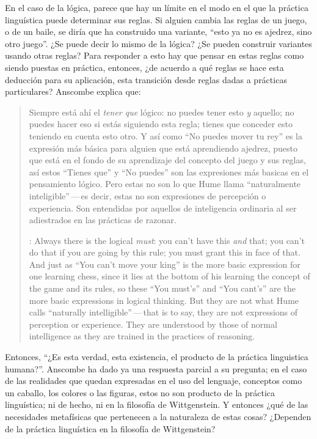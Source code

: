 En el caso de la lógica, parece que hay un límite en el modo en el que la práctica linguística puede determinar sus reglas. Si alguien cambia las reglas de un juego, o de un baile, se diría que ha construido una variante, \enquote{esto ya no es ajedrez, sino otro juego}. ¿Se puede decir lo mismo de la lógica? ¿Se pueden construir variantes usando otras reglas? Para responder a esto hay que pensar en estas reglas como siendo puestas en práctica, entonces, ¿de acuerdo a qué reglas se hace esta deducción para su aplicación, esta transición desde reglas dadas a prácticas particulares? Anscombe explica que: \blockquote[{\cite[121]{anscombe1981parmenides:qli}}: Always there is the logical \emph{must}: you can't have this \emph{and} that; you can't do that if you are going by this rule; you must grant this in face of that. And just as ``You can't move your king'' is the more basic expression for one learning chess, since it lies at the bottom of his learning the concept of the game and its rules, so these ``You must's'' and ``You cant's'' are the more basic expressions in logical thinking. But they are not what Hume calls ``naturally intelligible''\,---\,that is to say, they are not expressions of perception or experience. They are understood by those of normal intelligence as they are trained in the practices of reasoning.]{Siempre está ahí el \emph{tener que} lógico: no puedes tener esto \emph{y} aquello; no puedes hacer eso si estás siguiendo esta regla; tienes que conceder esto teniendo en cuenta esto otro. Y así como ``No puedes mover tu rey'' es la expresión más básica para alguien que está aprendiendo ajedrez, puesto que está en el fondo de su aprendizaje del concepto del juego y sus reglas, así estos ``Tienes que'' y ``No puedes'' son las expresiones más basicas en el pensamiento lógico. Pero estas no son lo que Hume llama ``naturalmente inteligible''\,---\,es decir, estas no son expresiones de percepción o experiencia. Son entendidas por aquellos de inteligencia ordinaria al ser adiestrados en las prácticas de razonar.}

Entonces, ``¿Es esta verdad, esta existencia, el producto de la práctica linguistica humana?''. Anscombe ha dado ya una respuesta parcial a su pregunta; en el caso de las realidades que quedan expresadas en el uso del lenguaje, conceptos como un caballo, los colores o las figuras, estos no son producto de la práctica linguística; ni de hecho, ni en la filosofía de Wittgenstein. Y entonces ¿qué de las necesidades metafísicas que pertenecen a la naturaleza de estas cosas? ¿Dependen de la práctica linguística en la filosofía de Wittgenstein?

